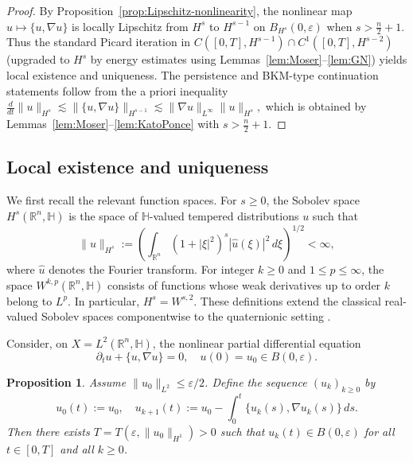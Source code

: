 \documentclass[10pt]{amsart}
\numberwithin{equation}{section}
\newtheorem{prop}[theorem]{Proposition}
\theoremstyle{remark}
\theoremstyle{definition}
\begin{document}
\begin{proof}
By Proposition~\ref{prop:Lipschitz-nonlinearity}, the nonlinear map $u\mapsto \{u,\nabla u\}$
is locally Lipschitz from $H^{s}$ to $H^{s-1}$ on $B_{H^s}(0,\varepsilon)$ when $s>\frac{n}{2}+1$.
Thus the standard Picard iteration in $C([0,T],H^{s-1})\cap C^{1}([0,T],H^{s-2})$ (upgraded to $H^{s}$ by energy estimates using Lemmas~\ref{lem:Moser}--\ref{lem:GN})
yields local existence and uniqueness. The persistence and BKM-type continuation statements follow from the a priori inequality
\(
\frac{d}{dt}\|u\|_{H^{s}}\lesssim \|\{u,\nabla u\}\|_{H^{s-1}}\lesssim \|\nabla u\|_{L^\infty}\|u\|_{H^{s}},
\)
which is obtained by Lemmas~\ref{lem:Moser}--\ref{lem:KatoPonce} with $s>\frac{n}{2}+1$.
\end{proof}


\subsection{Local existence and uniqueness}\label{subsec:local-wp}

We first recall the relevant function spaces. For \(s \geq 0\), the Sobolev space  \(H^s(\mathbb{R}^n, \mathbb{H})\) is the space of \(\mathbb{H}\)-valued tempered distributions \(u\) such that
\[
\|u\|_{H^s} := \left( \int_{\mathbb{R}^n} (1 + |\xi|^2)^s |\widehat{u}(\xi)|^2 \, d\xi \right)^{1/2} < \infty,
\]
where \(\widehat{u}\) denotes the Fourier transform. For integer \(k \geq 0\) and \(1 \leq p \leq \infty\), the space \(W^{k,p}(\mathbb{R}^n, \mathbb{H})\) consists of functions whose weak derivatives up to order \(k\) belong to \(L^p\). In particular, \(H^s = W^{s,2}\). These definitions extend the classical real-valued Sobolev spaces componentwise to the quaternionic setting \cite{Adams2003, ColomboSabadiniStruppa2011}.

Consider, on \(X = L^2(\mathbb{R}^n, \mathbb{H})\), the nonlinear partial differential equation
\begin{equation}\label{eq:pde}
\partial_t u + \{u, \nabla u\} = 0, \quad u(0) = u_0 \in B(0, \varepsilon).
\end{equation}


\begin{prop}\label{prop:picard}
Assume \(\|u_0\|_{L^2} \leq \varepsilon/2\). Define the sequence \((u_k)_{k\geq 0}\) by
\[
u_0(t) := u_0, \quad u_{k+1}(t) := u_0 - \int_0^t \{u_k(s), \nabla u_k(s)\} \, ds.
\]
Then there exists \(T = T(\varepsilon, \|u_0\|_{H^1}) > 0\) such that \(u_k(t) \in B(0, \varepsilon)\) for all \(t \in [0, T]\) and all \(k \geq 0\).
\end{prop}
\end{document}
